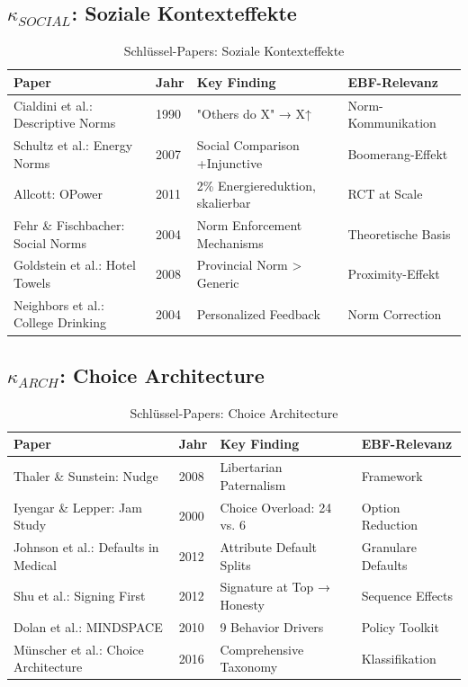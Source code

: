 \subsection{$\kappa_{SOCIAL}$: Soziale Kontexteffekte}

\begin{table}[htbp]
\centering
\caption{Schlüssel-Papers: Soziale Kontexteffekte}
\label{tab:dr-papers-social}
\renewcommand{\arraystretch}{1.2}
\scriptsize
\begin{tabular}{@{}p{3.5cm}p{2cm}p{4cm}p{3cm}@{}}
\toprule
\textbf{Paper} & \textbf{Jahr} & \textbf{Key Finding} & \textbf{EBF-Relevanz} \\
\midrule
Cialdini et al.: Descriptive Norms & 1990 & "Others do X" → X↑ & Norm-Kommunikation \\
Schultz et al.: Energy Norms & 2007 & Social Comparison +Injunctive & Boomerang-Effekt \\
Allcott: OPower & 2011 & 2\% Energiereduktion, skalierbar & RCT at Scale \\
Fehr \& Fischbacher: Social Norms & 2004 & Norm Enforcement Mechanisms & Theoretische Basis \\
Goldstein et al.: Hotel Towels & 2008 & Provincial Norm > Generic & Proximity-Effekt \\
Neighbors et al.: College Drinking & 2004 & Personalized Feedback & Norm Correction \\
\bottomrule
\end{tabular}
\end{table}

\subsection{$\kappa_{ARCH}$: Choice Architecture}

\begin{table}[htbp]
\centering
\caption{Schlüssel-Papers: Choice Architecture}
\label{tab:dr-papers-arch}
\renewcommand{\arraystretch}{1.2}
\scriptsize
\begin{tabular}{@{}p{3.5cm}p{2cm}p{4cm}p{3cm}@{}}
\toprule
\textbf{Paper} & \textbf{Jahr} & \textbf{Key Finding} & \textbf{EBF-Relevanz} \\
\midrule
Thaler \& Sunstein: Nudge & 2008 & Libertarian Paternalism & Framework \\
Iyengar \& Lepper: Jam Study & 2000 & Choice Overload: 24 vs. 6 & Option Reduction \\
Johnson et al.: Defaults in Medical & 2012 & Attribute Default Splits & Granulare Defaults \\
Shu et al.: Signing First & 2012 & Signature at Top → Honesty & Sequence Effects \\
Dolan et al.: MINDSPACE & 2010 & 9 Behavior Drivers & Policy Toolkit \\
Münscher et al.: Choice Architecture & 2016 & Comprehensive Taxonomy & Klassifikation \\
\bottomrule
\end{tabular}
\end{table}

